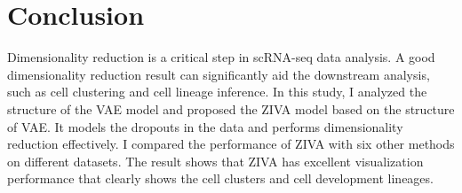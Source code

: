 \section{Conclusion}
Dimensionality reduction is a critical step in scRNA-seq data analysis. A good dimensionality reduction result can significantly aid the downstream analysis, such as cell clustering and cell lineage inference.
In this study, I analyzed the structure of the VAE model and proposed the ZIVA model based on the structure of VAE. It models the dropouts in the data and performs dimensionality reduction effectively. I compared the performance of ZIVA with six other methods on different datasets. The result shows that ZIVA has excellent visualization performance that clearly shows the cell clusters and cell development lineages.

